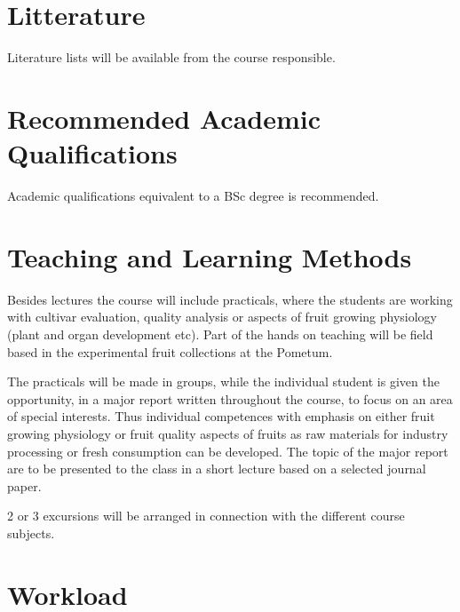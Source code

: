 \section*{Litterature}
Literature lists will be available from the course responsible.


\section*{Recommended Academic Qualifications}
Academic qualifications equivalent to a BSc degree is recommended.


\section*{Teaching and Learning Methods}
Besides lectures the course will include practicals, where the students are working with cultivar evaluation, quality analysis or aspects of fruit growing physiology (plant and organ development etc). Part of the hands on teaching will be field based in the experimental fruit collections at the Pometum.

\vspace*{1em}
The practicals will be made in groups, while the individual student is given the opportunity, in a major report written throughout the course, to focus on an area of special interests. Thus individual competences with emphasis on either fruit growing physiology or fruit quality aspects of fruits as raw materials for industry processing or fresh consumption can be developed. The topic of the major report are to be presented to the class in a short lecture based on a selected journal paper.
\vspace*{1em}

2 or 3 excursions will be arranged in connection with the different course subjects.

\section*{Workload}

